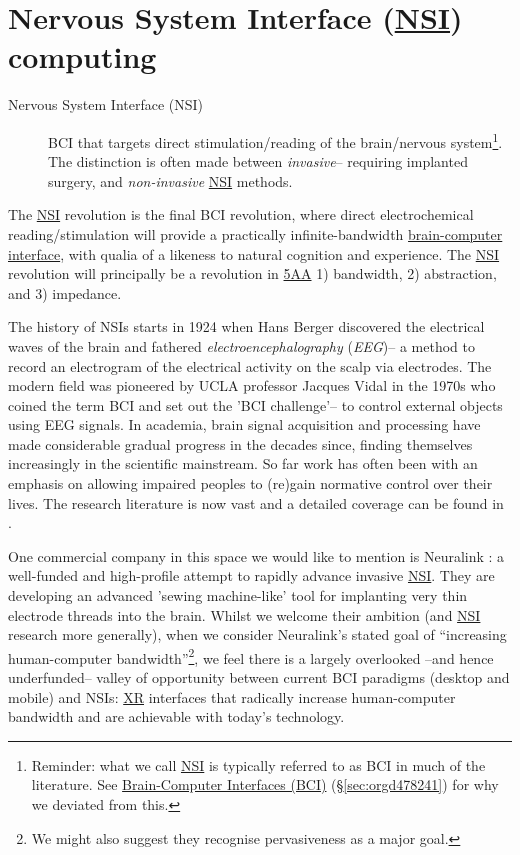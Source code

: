 \documentclass[logo,bsc,singlespacing,parskip]{infthesis}
\begin{document}
\section{Nervous System Interface (\hyperref[org5662848]{NSI}) computing}
\label{sec:org657e84e}
\begin{mdframed}
\begin{description}
\item[{Nervous System Interface (\label{org5662848}NSI)}] BCI that targets direct stimulation/reading of the brain/nervous system\footnote{Reminder: what we call \hyperref[org5662848]{NSI} is typically referred to as BCI in much of the literature. See \hyperref[sec:orgd478241]{Brain-Computer Interfaces (BCI)} (\S \ref{sec:orgd478241}) for why we deviated from this.}.
The distinction is often made between \emph{invasive}-- requiring implanted surgery, and \emph{non-invasive} \hyperref[org5662848]{NSI} methods.
\end{description}
\end{mdframed}

The \hyperref[org5662848]{NSI} revolution is the final BCI revolution, where direct electrochemical reading/stimulation will provide a practically infinite-bandwidth \hyperref[org89a0382]{brain-computer interface}, with qualia of a likeness to natural cognition and experience.
The \hyperref[org5662848]{NSI} revolution will principally be a revolution in \hyperref[orgafbfd0c]{5AA} 1) bandwidth, 2) abstraction, and 3) impedance.

The history of NSIs starts in 1924 when Hans Berger discovered the electrical waves of the brain and fathered \emph{electroencephalography} (\emph{EEG})--  a method to record an electrogram of the electrical activity on the scalp via electrodes.
The modern field was pioneered by UCLA professor Jacques Vidal in the 1970s who coined the term BCI and set out the 'BCI challenge'-- to control external objects using EEG signals.
In academia, brain signal acquisition and processing have made considerable gradual progress in the decades since, finding themselves increasingly in the scientific mainstream.
So far work has often been with an emphasis on allowing impaired peoples to (re)gain normative control over their lives.
The research literature is now vast and a detailed coverage can be found in \autocite{kawala-sterniukSummaryFiftyYears2021}.

One commercial company in this space we would like to mention is Neuralink \autocite{muskNeuralink}: a well-funded and high-profile attempt to rapidly advance invasive \hyperref[org5662848]{NSI}.
They are developing an advanced 'sewing machine-like' tool for implanting very thin electrode threads into the brain.
Whilst we welcome their ambition (and \hyperref[org5662848]{NSI} research more generally), when we consider Neuralink's stated goal of ``increasing human-computer bandwidth''\footnote{We might also suggest they recognise pervasiveness as a major goal.}, we feel there is a largely overlooked --and hence underfunded-- valley of opportunity between current BCI paradigms (desktop and mobile) and NSIs: \hyperref[orgf7f8e78]{XR} interfaces that radically increase human-computer bandwidth and are achievable with today's technology.
\end{document}
